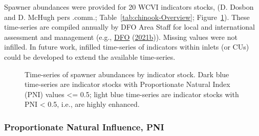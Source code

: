 \documentclass[11pt]{book}
\begin{document}
Spawner abundances were provided for 20 WCVI indicators stocks, (D. Dosbon and D. McHugh pers .comm.; Table~\ref{tab:chinook-Overview}; Figure~\ref{fig:chinook-IndTimeSeries}). These time-series are compiled annually by DFO Area Staff for local and international assessment and management (e.g., \protect\hyperlink{ref-dfoWCVISalmonBulletin2021}{DFO} (\protect\hyperlink{ref-dfoWCVISalmonBulletin2021}{2021b})). Missing values were not infilled. In future work, infilled time-series of indicators within inlets (or CUs) could be developed to extend the available time-series.
\begin{figure}[htb]

{\centering {} 

}

\caption{Time-series of spawner abundances by indicator stock. Dark blue time-series are indicator stocks with Proportionate Natural Index (PNI) values <= 0.5; light blue time-series are indicator stocks with PNI < 0.5, i.e., are highly enhanced.}\label{fig:chinook-IndTimeSeries}
\end{figure}
\hypertarget{proportionate-natural-influence-pni}{%
\subsubsection{Proportionate Natural Influence, PNI}\label{proportionate-natural-influence-pni}}
\end{document}
